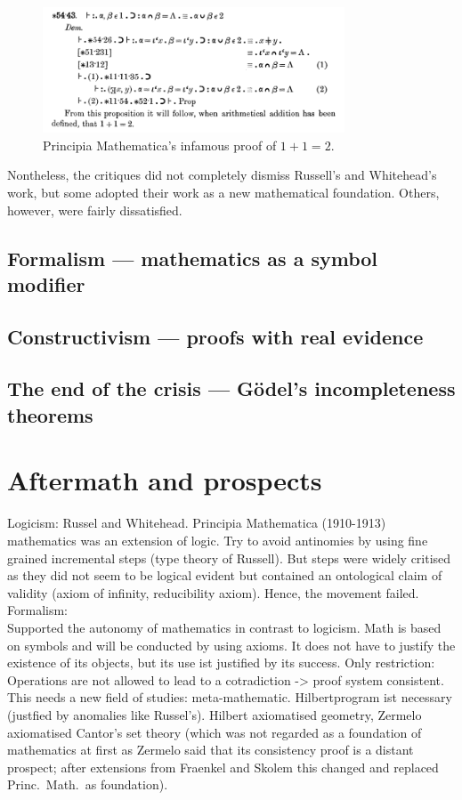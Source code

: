 \documentclass[hidelinks]{article}
\theoremstyle{plain}
\theoremstyle{definition}
\theoremstyle{rem}
\begin{document}
\begin{figure}[h]
	\centering
	\includegraphics[width=0.8\textwidth]{img/principia_mathematica.png}
	\caption{Principia Mathematica's infamous proof of $1+1=2$.}
\end{figure}

Nontheless, the critiques did not completely dismiss Russell's and Whitehead's work, but some adopted their work as a new mathematical foundation. Others, however, were fairly dissatisfied. 


\subsection{Formalism --- mathematics as a symbol modifier}

\subsection{Constructivism --- proofs with real evidence}

\subsection{The end of the crisis --- Gödel's incompleteness theorems}\label{ssec_end_crisis}

\section{Aftermath and prospects}

Logicism:
Russel and Whitehead. Principia Mathematica (1910-1913) mathematics was an extension of logic. Try to avoid antinomies by using fine grained incremental steps (type theory of Russell). But steps were widely critised as they did not seem to be logical evident but contained an ontological claim of validity (axiom of infinity, reducibility axiom). Hence, the movement failed.\\

Formalism:\\
Supported the autonomy of mathematics in contrast to logicism. Math is based on symbols and will be conducted by using axioms. It does not have to justify the existence of its objects, but its use ist justified by its success. Only restriction: Operations are not allowed to lead to a cotradiction -> proof system consistent. This needs a new field of studies: meta-mathematic. Hilbertprogram ist necessary (justfied by anomalies like Russel's). Hilbert axiomatised geometry, Zermelo axiomatised Cantor's set theory (which was not regarded as a foundation of mathematics at first as Zermelo said that its consistency proof is a distant prospect; after extensions from Fraenkel and Skolem this changed and replaced Princ.\ Math.\ as foundation).  \\
\end{document}
